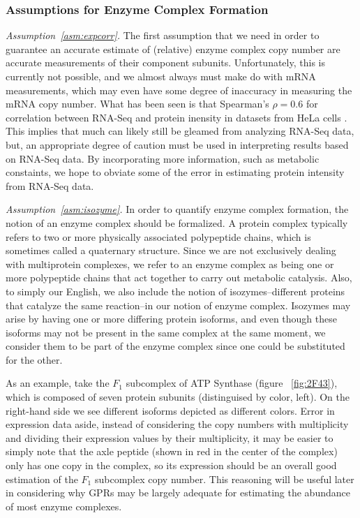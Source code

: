 \subsubsection{Assumptions for Enzyme Complex Formation}
\emph{Assumption~\ref{asm:expcorr}.}
The first assumption that we need in order to guarantee an accurate
estimate of (relative) enzyme complex copy number are accurate
measurements of their component subunits. Unfortunately, this is
currently not possible, and we almost always must make do with mRNA
measurements, which may even have some degree of inaccuracy in
measuring the mRNA copy number. What has been seen is that Spearman's
$\rho = 0.6$ for correlation between RNA-Seq and protein inensity in
datasets from HeLa cells \citep{Nagaraj2011}. This implies that much
can likely still be gleamed from analyzing RNA-Seq data, but, an
appropriate degree of caution must be used in interpreting results
based on RNA-Seq data. By incorporating more information, such as
metabolic constaints, we hope to obviate some of the error in
estimating protein intensity from RNA-Seq data. 

\emph{Assumption~\ref{asm:isozyme}.}
In order to quantify enzyme complex formation, the notion of an enzyme
complex should be formalized.
A protein complex typically refers to two or more physically associated polypeptide chains, which is
sometimes called a quaternary structure. Since we
are not exclusively dealing with multiprotein complexes, we refer to an enzyme complex as being
one or more polypeptide chains that act together to carry out metabolic catalysis. Also, to simply
our English, we also include the notion of isozymes--different proteins that catalyze the 
same reaction--in our notion of enzyme complex. Isozymes may arise by having one or more differing
protein isoforms, and even though these isoforms may not be present in the same complex at the same
moment, we consider them to be part of the enzyme complex since one could be substituted for the other.

As an example, take the $F_1$ subcomplex of ATP Synthase (figure
~\ref{fig:2F43}), which is composed of seven protein subunits
(distinguised by color, left). On the right-hand side we see different
isoforms depicted as different colors.  Error in expression data
aside, instead of considering the copy numbers with multiplicity and
dividing their expression values by their multiplicity, it may be
easier to simply note that the axle peptide (shown in red in the
center of the complex) only has one copy in the complex, so its
expression should be an overall good estimation of the $F_1$ subcomplex
copy number. This reasoning will be useful later in considering why
GPRs may be largely adequate for estimating the abundance of most
enzyme complexes.

